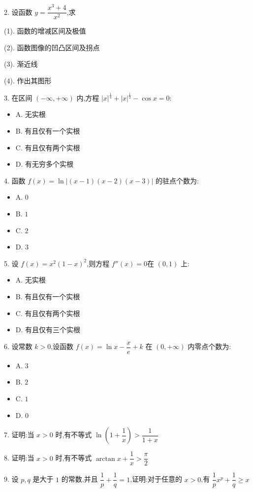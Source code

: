 2. 设函数 $y=\dfrac{x^{3}+4}{x^{2}}$,求

(1). 函数的增减区间及极值

(2). 函数图像的凹凸区间及拐点

(3). 渐近线

(4). 作出其图形

3. 在区间 $(-\infty,+\infty)$ 内,方程 $|x|^{\frac{1}{4}}+|x|^{\frac{1}{2}}-\cos x=0$: 
\begin{itemize}
	\item A. 无实根
	\item B. 有且仅有一个实根
	\item C. 有且仅有两个实根
	\item D. 有无穷多个实根
\end{itemize}

4. 函数 $f(x)=\ln|(x-1)(x-2)(x-3)|$ 的驻点个数为:
\begin{itemize}
	\item A. $0$
	\item B. $1$
	\item C. $2$
	\item D. $3$
\end{itemize}

5. 设 $f(x)=x^{2}(1-x)^{2}$,则方程 $f''(x)=0$在 $(0,1)$ 上:
\begin{itemize}
	\item A. 无实根
	\item B. 有且仅有一个实根
	\item C. 有且仅有两个实根
	\item D. 有且仅有三个实根
\end{itemize}

6. 设常数 $k>0$,设函数 $f(x)=\ln x-\dfrac{x}{e}+k$ 在 $(0,+\infty)$ 内零点个数为:
\begin{itemize}
	\item A. $3$
	\item B. $2$
	\item C. $1$
	\item D. $0$
\end{itemize}

7. 证明:当 $x>0$ 时,有不等式 $\ln(1+\dfrac{1}{x})>\dfrac{1}{1+x}$

8. 证明:当 $x>0$ 时,有不等式 $\arctan x+\dfrac{1}{x}>\dfrac{\pi}{2}$

9. 设 $p,q$ 是大于 $1$ 的常数,并且 $\dfrac{1}{p}+\dfrac{1}{q}=1$,证明:对于任意的 $x>0$,有 $\dfrac{1}{p}x^{p}+\dfrac{1}{q}\geq x$


